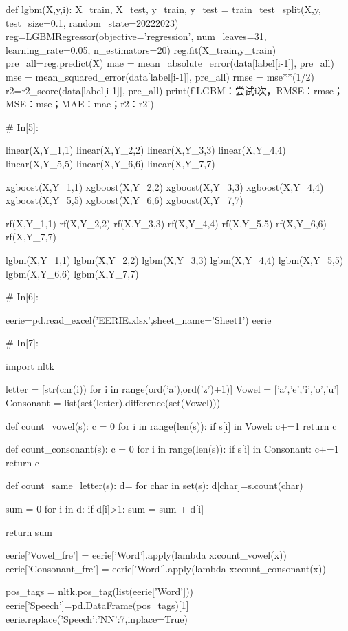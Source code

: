 \documentclass{MathModeling}
\begin{document}
\begin{python}
def lgbm(X,y,i):
    X_train, X_test, y_train, y_test = train_test_split(X,y, test_size=0.1, random_state=20222023)
    reg=LGBMRegressor(objective='regression', num_leaves=31, learning_rate=0.05, n_estimators=20)
    reg.fit(X_train,y_train)
    pre_all=reg.predict(X)
    mae = mean_absolute_error(data[label[i-1]], pre_all)
    mse = mean_squared_error(data[label[i-1]], pre_all)
    rmse = mse**(1/2)
    r2=r2_score(data[label[i-1]], pre_all)
    print(f'LGBM：尝试{i}次，RMSE：{rmse}；MSE：{mse}；MAE：{mae}；r2：{r2}')


# In[5]:


linear(X,Y_1,1)
linear(X,Y_2,2)
linear(X,Y_3,3)
linear(X,Y_4,4)
linear(X,Y_5,5)
linear(X,Y_6,6)
linear(X,Y_7,7)

xgboost(X,Y_1,1)
xgboost(X,Y_2,2)
xgboost(X,Y_3,3)
xgboost(X,Y_4,4)
xgboost(X,Y_5,5)
xgboost(X,Y_6,6)
xgboost(X,Y_7,7)

rf(X,Y_1,1)
rf(X,Y_2,2)
rf(X,Y_3,3)
rf(X,Y_4,4)
rf(X,Y_5,5)
rf(X,Y_6,6)
rf(X,Y_7,7)

lgbm(X,Y_1,1)
lgbm(X,Y_2,2)
lgbm(X,Y_3,3)
lgbm(X,Y_4,4)
lgbm(X,Y_5,5)
lgbm(X,Y_6,6)
lgbm(X,Y_7,7)


# In[6]:


eerie=pd.read_excel('EERIE.xlsx',sheet_name='Sheet1')
eerie


# In[7]:


import nltk

letter = [str(chr(i)) for i in range(ord('a'),ord('z')+1)]
Vowel = ['a','e','i','o','u']
Consonant = list(set(letter).difference(set(Vowel)))


def count_vowel(s):
    c = 0
    for i in range(len(s)):
        if s[i] in Vowel:
            c+=1
    return c


def count_consonant(s):
    c = 0
    for i in range(len(s)):
        if s[i] in Consonant:
            c+=1
    return c


def count_same_letter(s):
    d={}
    for char in set(s):
        d[char]=s.count(char)

    sum = 0
    for i in d:
        if d[i]>1:
            sum = sum + d[i]

    return sum


eerie['Vowel_fre'] = eerie['Word'].apply(lambda x:count_vowel(x))
eerie['Consonant_fre'] = eerie['Word'].apply(lambda x:count_consonant(x))

pos_tags = nltk.pos_tag(list(eerie['Word']))
eerie['Speech']=pd.DataFrame(pos_tags)[1]
eerie.replace({'Speech':{'NN':7}},inplace=True)


\end{python}
\end{document}
